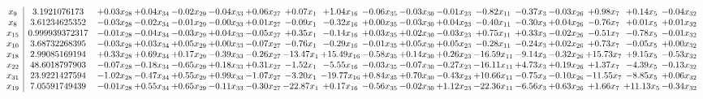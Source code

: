 \documentclass[9pt]{article}
\begin{document}
 \[\begin{array}{c| c c@{\hskip 2pt} c@{\hskip 2pt} c@{\hskip 2pt} c@{\hskip 2pt} c@{\hskip 2pt} c@{\hskip 2pt} c@{\hskip 2pt} c@{\hskip 2pt} c@{\hskip 2pt} c@{\hskip 2pt} c@{\hskip 2pt} c@{\hskip 2pt} c@{\hskip 2pt} c@{\hskip 2pt} c@{\hskip 2pt} c@{\hskip 2pt} }
 x_{9}   &  3.1921076173 & +  0.03 x_{28} & +  0.04 x_{34} & -0.02 x_{29} & -0.04 x_{33} & +  0.06 x_{27} & +  0.07 x_{1} & +  1.04 x_{16} & -0.06 x_{35} & -0.03 x_{30} & -0.01 x_{23} & -0.82 x_{11} & -0.37 x_{3} & -0.03 x_{26} & +  0.98 x_{7} & +  0.14 x_{5} & -0.04 x_{32}\\
 x_{8}   &  3.61234625352 & -0.03 x_{28} & -0.02 x_{34} & -0.01 x_{29} & -0.00 x_{33} & +  0.01 x_{27} & -0.09 x_{1} & -0.32 x_{16} & +  0.00 x_{35} & -0.03 x_{30} & +  0.04 x_{23} & -0.40 x_{11} & -0.30 x_{3} & +  0.04 x_{26} & -0.76 x_{7} & +  0.01 x_{5} & +  0.01 x_{32}\\
 x_{15}   &  0.999939372317 & -0.01 x_{28} & -0.04 x_{34} & -0.03 x_{29} & +  0.04 x_{33} & -0.05 x_{27} & +  0.35 x_{1} & -0.14 x_{16} & +  0.03 x_{35} & +  0.02 x_{30} & -0.03 x_{23} & +  0.75 x_{11} & +  0.33 x_{3} & -0.02 x_{26} & -0.51 x_{7} & -0.78 x_{5} & -0.01 x_{32}\\
 x_{10}   &  3.68732268395 & -0.03 x_{28} & +  0.03 x_{34} & +  0.05 x_{29} & +  0.00 x_{33} & -0.07 x_{27} & -0.76 x_{1} & -0.29 x_{16} & -0.01 x_{35} & +  0.05 x_{30} & +  0.05 x_{23} & -0.28 x_{11} & -0.24 x_{3} & +  0.02 x_{26} & +  0.73 x_{7} & -0.05 x_{5} & +  0.00 x_{32}\\
 x_{18}   &  2.99085169194 & +  0.33 x_{28} & +  0.69 x_{34} & +  0.17 x_{29} & -0.39 x_{33} & -0.26 x_{27} & -13.47 x_{1} & + 15.49 x_{16} & -0.58 x_{35} & +  0.14 x_{30} & +  0.26 x_{23} & -16.59 x_{11} & -9.14 x_{3} & -0.32 x_{26} & + 15.73 x_{7} & +  9.15 x_{5} & -0.53 x_{32}\\
 x_{22}   &  48.6018797903 & -0.07 x_{28} & -0.18 x_{34} & -0.65 x_{29} & +  0.18 x_{33} & +  0.31 x_{27} & -1.52 x_{1} & -5.55 x_{16} & -0.03 x_{35} & -0.07 x_{30} & -0.27 x_{23} & -16.11 x_{11} & +  4.73 x_{3} & +  0.19 x_{26} & +  1.37 x_{7} & -4.39 x_{5} & -0.13 x_{32}\\
 x_{31}   &  23.9221427594 & -1.02 x_{28} & -0.47 x_{34} & +  0.55 x_{29} & +  0.99 x_{33} & -1.07 x_{27} & -3.20 x_{1} & -19.77 x_{16} & +  0.84 x_{35} & +  0.70 x_{30} & -0.43 x_{23} & + 10.66 x_{11} & -0.75 x_{3} & -0.10 x_{26} & -11.55 x_{7} & -8.85 x_{5} & +  0.06 x_{32}\\
 x_{19}   &  7.05591749439 & -0.01 x_{28} & +  0.55 x_{34} & +  0.65 x_{29} & -0.11 x_{33} & -0.30 x_{27} & -22.87 x_{1} & +  0.17 x_{16} & -0.56 x_{35} & -0.02 x_{30} & +  1.12 x_{23} & -22.36 x_{11} & -6.56 x_{3} & +  0.63 x_{26} & +  1.66 x_{7} & + 11.13 x_{5} & -0.34 x_{32}\\

\end{array}\]
\end{document}
